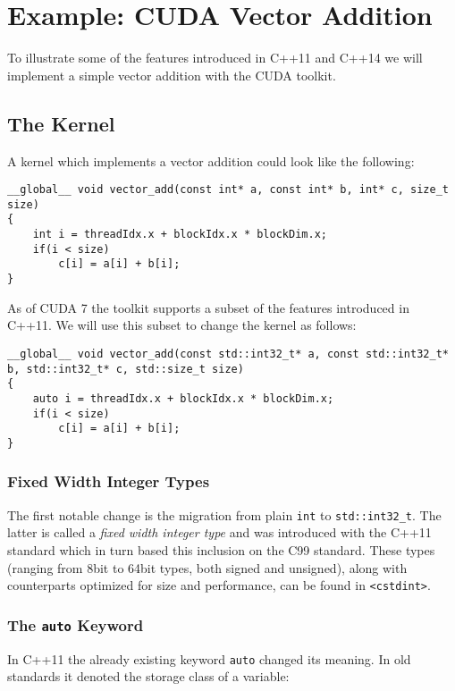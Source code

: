 \section{Example: CUDA Vector Addition}

To illustrate some of the features introduced in C++11 and C++14 we will implement a simple vector addition with the CUDA toolkit.

\subsection{The Kernel}

A kernel which implements a vector addition could look like the following:

\begin{lstlisting}
__global__ void vector_add(const int* a, const int* b, int* c, size_t size)
{
    int i = threadIdx.x + blockIdx.x * blockDim.x;
    if(i < size)
        c[i] = a[i] + b[i];
}
\end{lstlisting}

As of CUDA 7 the toolkit supports a subset of the features introduced in C++11. We will use this subset to change the kernel as follows:

\begin{lstlisting}
__global__ void vector_add(const std::int32_t* a, const std::int32_t* b, std::int32_t* c, std::size_t size)
{
    auto i = threadIdx.x + blockIdx.x * blockDim.x;
    if(i < size)
        c[i] = a[i] + b[i];
}
\end{lstlisting}

\subsubsection{Fixed Width Integer Types}

The first notable change is the migration from plain \texttt{int} to \texttt{std::int32\_t}. The latter is called a \textit{fixed width integer type} and was introduced with the C++11 standard which in turn based this inclusion on the C99 standard. These types (ranging from 8bit to 64bit types, both signed and unsigned), along with counterparts optimized for size and performance, can be found in \texttt{<cstdint>}.

\subsubsection{The \texttt{auto} Keyword}

In C++11 the already existing keyword \texttt{auto} changed its meaning. In old standards it denoted the storage class of a variable:


